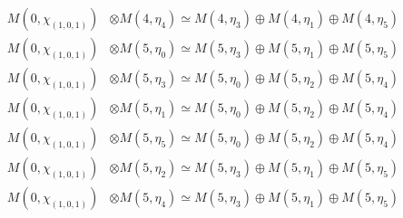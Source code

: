 \begin{align*}
M(0,\chi_{(1,0,1)}) &\otimes M(4,\eta_{4}) \simeq M(4,\eta_{3}) \oplus M(4,\eta_{1}) \oplus M(4,\eta_{5})\\
M(0,\chi_{(1,0,1)}) &\otimes M(5,\eta_{0}) \simeq M(5,\eta_{3}) \oplus M(5,\eta_{1}) \oplus M(5,\eta_{5})\\
M(0,\chi_{(1,0,1)}) &\otimes M(5,\eta_{3}) \simeq M(5,\eta_{0}) \oplus M(5,\eta_{2}) \oplus M(5,\eta_{4})\\
M(0,\chi_{(1,0,1)}) &\otimes M(5,\eta_{1}) \simeq M(5,\eta_{0}) \oplus M(5,\eta_{2}) \oplus M(5,\eta_{4})\\
M(0,\chi_{(1,0,1)}) &\otimes M(5,\eta_{5}) \simeq M(5,\eta_{0}) \oplus M(5,\eta_{2}) \oplus M(5,\eta_{4})\\
M(0,\chi_{(1,0,1)}) &\otimes M(5,\eta_{2}) \simeq M(5,\eta_{3}) \oplus M(5,\eta_{1}) \oplus M(5,\eta_{5})\\
M(0,\chi_{(1,0,1)}) &\otimes M(5,\eta_{4}) \simeq M(5,\eta_{3}) \oplus M(5,\eta_{1}) \oplus M(5,\eta_{5})\\
\end{align*}

